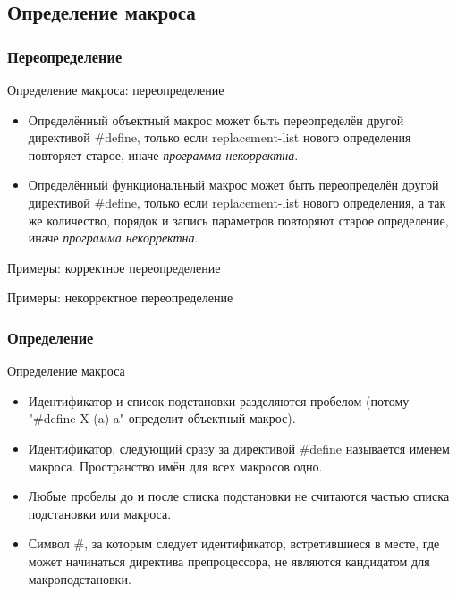     \subsection{Определение макроса}
    \subsubsection{Переопределение}
    \begin{frame}{Определение макроса: переопределение}
        \begin{itemize}
            \item Определённый объектный макрос может быть переопределён другой директивой \#define,
                только если replacement-list нового определения повторяет старое, иначе \textit{программа некорректна}.
            \item Определённый функциональный макрос может быть переопределён другой директивой \#define,
                только если replacement-list нового определения, а так же количество, порядок и запись параметров
                повторяют старое определение, иначе \textit{программа некорректна}.
        \end{itemize}
    \end{frame}
    \begin{frame}{Примеры: корректное переопределение}
        
    \end{frame}
    \begin{frame}{Примеры: некорректное переопределение}
        
    \end{frame}
    \subsubsection{Определение}
    \begin{frame}{Определение макроса}
        \begin{itemize}
            \item Идентификатор и список подстановки разделяются пробелом (потому "\#define X (a) a" определит объектный макрос).
            \item Идентификатор, следующий сразу за директивой \#define называется именем макроса. Пространство имён для всех макросов одно.
            \item Любые пробелы до и после списка подстановки не считаются частью списка подстановки или макроса.
            \item Символ \#, за которым следует идентификатор, встретившиеся в месте, где может начинаться директива препроцессора,
                не являются кандидатом для макроподстановки.
        \end{itemize}
    \end{frame}
